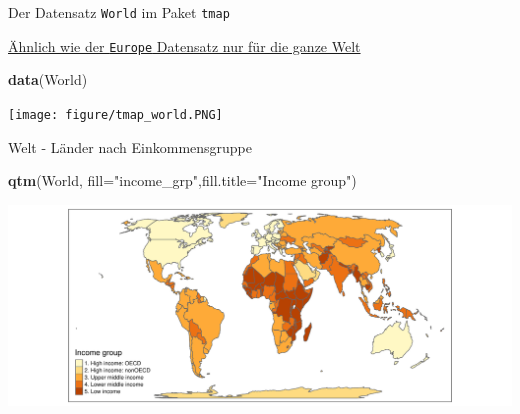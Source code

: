 \documentclass[ignorenonframetext,]{beamer}
\newenvironment{Shaded}{\begin{snugshade}}{\end{snugshade}}
\newcommand{\KeywordTok}[1]{\textcolor[rgb]{0.13,0.29,0.53}{\textbf{#1}}}
\newcommand{\DataTypeTok}[1]{\textcolor[rgb]{0.13,0.29,0.53}{#1}}
\newcommand{\StringTok}[1]{\textcolor[rgb]{0.31,0.60,0.02}{#1}}
\newcommand{\NormalTok}[1]{#1}
\begin{document}
\begin{frame}[fragile]{Der Datensatz \texttt{World} im Paket
\texttt{tmap}}

\begin{block}{\href{http://rpubs.com/Japhilko82/tmap_World}{Ähnlich wie
der \texttt{Europe} Datensatz nur für die ganze Welt}}

\begin{Shaded}
\begin{Highlighting}[]
\KeywordTok{data}\NormalTok{(World)}
\end{Highlighting}
\end{Shaded}

\texttt{[image: figure/tmap\_world.PNG]}

\end{block}

\end{frame}

\begin{frame}[fragile]{Welt - Länder nach Einkommensgruppe}

\begin{Shaded}
\begin{Highlighting}[]
\KeywordTok{qtm}\NormalTok{(World, }\DataTypeTok{fill=}\StringTok{"income_grp"}\NormalTok{,}\DataTypeTok{fill.title=}\StringTok{"Income group"}\NormalTok{) }
\end{Highlighting}
\end{Shaded}

\includegraphics{tmap_files/figure-beamer/unnamed-chunk-26-1.pdf}

\end{frame}
\end{document}
